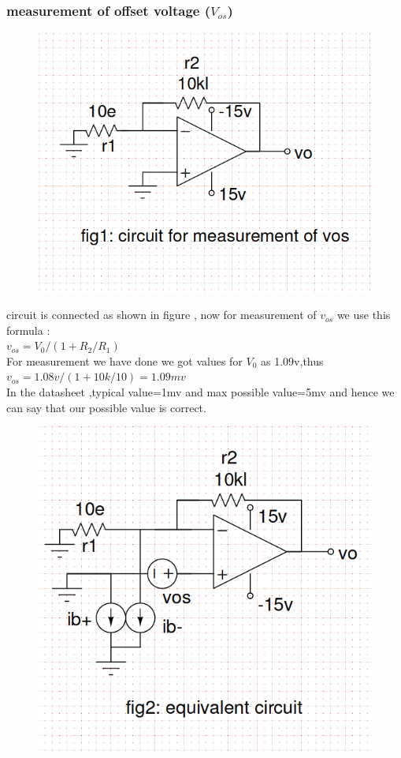 \documentclass[12pt]{article}
\begin{document}
\subsubsection{measurement of offset voltage (\(V_{os}\))}
\begin{figure}[h!]
\centering
\includegraphics[scale = 0.5]{q1a_1.png}
\end{figure}
circuit is connected as shown in figure , now for measurement of \(v_{os}\) we use this formula :\\
\(v_{os}=V_{0}/(1+R_{2}/R_{1})\)\\
For measurement we have done we got values for \(V_{0}\) as 1.09v,thus\\
\(v_{os}=1.08v/(1+10k/10)=1.09mv\)\\
In the datasheet ,typical value=1mv and max possible value=5mv and hence we can say that our possible value is correct.
\newpage
\begin{figure}[h!]
\centering
\includegraphics[scale = 0.6]{q1a_2.png}
\end{figure}
\newpage
\end{document}
